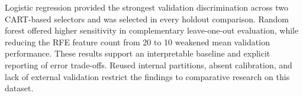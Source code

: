 Logistic regression provided the strongest validation discrimination across two CART-based selectors and was selected in every holdout comparison. Random forest offered higher sensitivity in complementary leave-one-out evaluation, while reducing the RFE feature count from 20 to 10 weakened mean validation performance. These results support an interpretable baseline and explicit reporting of error trade-offs. Reused internal partitions, absent calibration, and lack of external validation restrict the findings to comparative research on this dataset.
